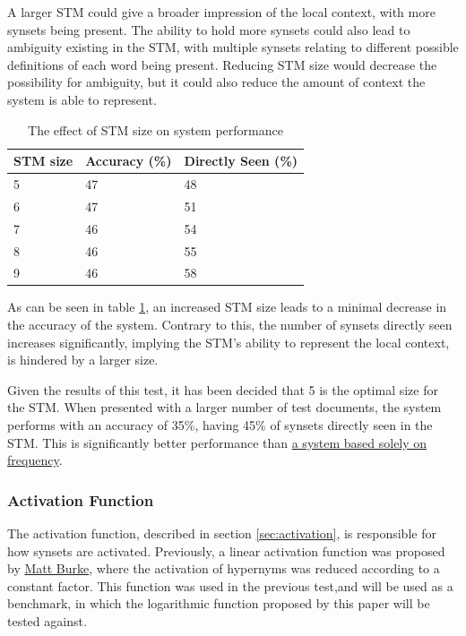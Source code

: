 \documentclass[]{article}
\begin{document}
A larger STM could give a broader impression of the local context, with more synsets being present. The ability to hold more synsets could also lead to ambiguity existing in the STM, with multiple synsets relating to different possible definitions of each word being present. Reducing STM size would decrease the possibility for ambiguity, but it could also reduce the amount of context the system is able to represent.

\begin{table}
\begin{center}
\begin{tabular}{|p{8em}|p{8em}|p{8em}|}
	\hline
	STM size & Accuracy (\%) & Directly Seen (\%) \\
	\hline
	5 & 47 & 48\\
	\hline
	6 & 47 & 51\\
	\hline
	7 & 46 & 54\\
	\hline
	8 & 46 & 55\\
	\hline
	9 & 46 & 58\\
	\hline
\end{tabular}
\end{center}
\caption{The effect of STM size on system performance}
\label{table:STMSize}
\end{table}

As can be seen in table \ref{table:STMSize}, an increased STM size leads to a minimal decrease in the accuracy of the system. Contrary to this, the number of synsets directly seen increases significantly, implying the STM's ability to represent the local context, is hindered by a larger size.

Given the results of this test, it has been decided that 5 is the optimal size for the STM. When presented with a larger number of test documents, the system performs with an accuracy of 35\%, having 45\% of synsets directly seen in the STM. This is significantly better performance than \hyperref[sec:EvFrequency]{ a system based solely on frequency}.

\subsubsection{Activation Function}
\label{sec:EvActivation}
The activation function, described in section \ref{sec:activation}, is responsible for how synsets are activated. Previously, a linear activation function was proposed by \hyperref[sec:MattBurke]{Matt Burke}, where the activation of hypernyms was reduced according to a constant factor. This function was used in the previous test,and will be used as a benchmark, in which the logarithmic function proposed by this paper will be tested against. 
\end{document}
